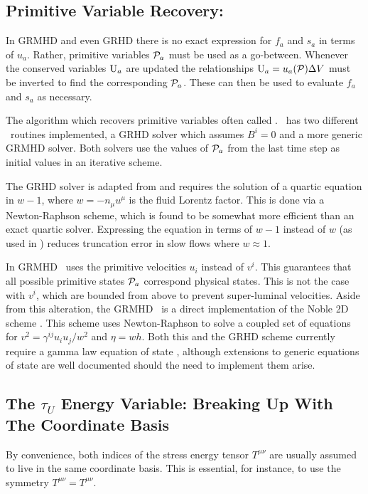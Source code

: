 \subsection{Primitive Variable Recovery: \ctop}

In GRMHD and even GRHD there is no exact expression for $f_a$ and $s_a$ in terms of $u_a$.  Rather, primitive variables $\mathcal{P}_a$ must be used as a go-between. Whenever the conserved variables $\mathrm{U}_a$ are updated the relationships $\mathrm{U}_a = u_a(\mathcal{P}) \Delta V$ must be inverted to find the corresponding $\mathcal{P}_a$.  These can then be used to evaluate $f_a$ and $s_a$ as necessary.

The algorithm which recovers primitive variables often called \ctop.  \grdisco\ has two different \ctop\ routines implemented, a GRHD solver which assumes $B^i=0$ and a more generic GRMHD solver.  Both solvers use the values of $\mathcal{P}_a$ from the last time step as initial values in an iterative scheme.  

The GRHD solver is adapted from \citet{Duez05} and requires the solution of a quartic equation in $w-1$, where $w = -n_\mu u^\mu$ is the fluid Lorentz factor.  This is done via a Newton-Raphson scheme, which is found to be somewhat more efficient than an exact quartic solver.  Expressing the equation in terms of $w-1$ instead of $w$ (as used in \citet{Duez05}) reduces truncation error in slow flows where $w \approx 1$.

In GRMHD \grdisco\ uses the primitive velocities $u_i$ instead of $v^i$.  This guarantees that all possible primitive states $\mathcal{P}_a$ correspond physical states.  This is not the case with $v^i$, which are bounded from above to prevent super-luminal velocities.  Aside from this alteration, the GRMHD \ctop\  is a direct implementation of the Noble 2D scheme \citep{Noble06}.  This scheme uses Newton-Raphson to solve a coupled set of equations for $v^2 = \gamma^{ij}u_i u_j / w^2$ and $\eta = w h$.  Both this and the GRHD scheme currently require a gamma law equation of state , although extensions to generic equations of state are well documented should the need to implement them arise.

\subsection{The $\tau_U$ Energy Variable: Breaking Up With The Coordinate Basis}

By convenience, both indices of the stress energy tensor $T^{\mu\nu}$ are usually assumed to live in the same coordinate basis.  This is essential, for instance, to use the symmetry $T^{\mu\nu} = T^{\mu\nu}$.

